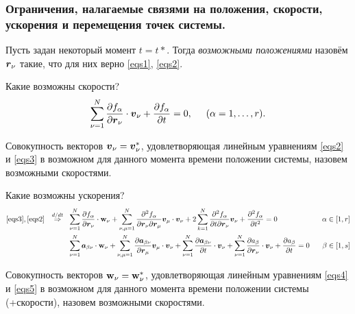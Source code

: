 \subsubsection*{Ограничения, налагаемые связями на положения, скорости, ускорения и перемещения точек системы.}

Пусть задан некоторый момент $t = t*$. Тогда \textit{возможными положениями} назовём $\mbox{\boldmath $r$}_\nu$ такие, что для них верно \eqref{eqs1}, \eqref{eqs2}. 

Какие возможны скорости?
\begin{equation}
    \label{eqs3}
    \sum_{\nu=1}^N \frac{\partial f_\alpha}{\partial \mbox{\boldmath $r$}_\nu} \cdot \mbox{\boldmath $v$}_\nu +   \frac{\partial f_\alpha}{\partial t} = 0, \hspace{0.5cm} (\alpha = 1, \ldots, r).
\end{equation}

Совокупность векторов $\mbox{\boldmath $v$}_\nu = \mbox{\boldmath $v$}_\nu^*$, удовлетворяющая линейным
уравнениям \eqref{eqs2} и \eqref{eqs3} в возможном для данного момента времени положении
системы, назовем возможными скоростями. 

Какие возможны ускорения?
\begin{align}
\label{eqs4}
    \eqref{eqs3}, \eqref{eqs2}
    \hspace{0.25cm} \overset{d / dt}{\Rightarrow} \hspace{0.25cm} 
    & \sum_{\nu=1}^N \frac{\partial f_\alpha}{\partial \mbox{\boldmath $r$}_\nu} \cdot \mbox{\boldmath $\mathrm{w}$}_\nu +
    \sum_{\nu, \mu=1}^N \frac{\partial^2 f_\alpha}{\partial \mbox{\boldmath $r$}_\nu \partial \mbox{\boldmath $r$}_\mu} \mbox{\boldmath $v$}_\mu \cdot \mbox{\boldmath $v$}_\nu + 2 \sum_{k=1}^N \frac{\partial^2 f_\alpha}{\partial t \partial \mbox{\boldmath $r$}_\nu} \mbox{\boldmath $v$}_\nu + \frac{\partial^2 f_\alpha}{\partial t^2}  = 0 
    \hspace{0.25cm} &\alpha \in [1, r]\\
\label{eqs5}
    & \sum_{\nu=1}^N \mbox{\boldmath $a$}_{\beta\nu} \cdot \mbox{\boldmath $\mathrm{w}$}_\nu + \sum_{\nu, \mu =1}^N \frac{\partial \mbox{\boldmath $a$}_{\beta\nu}}{\partial \mbox{\boldmath $r$}_\mu} \mbox{\boldmath $v$}_\mu \cdot \mbox{\boldmath $v$}_\nu + \sum_{\nu=1}^N \frac{\partial \mbox{\boldmath $a$}_{\beta\nu}}{\partial t} \cdot \mbox{\boldmath $v$}_\nu + \sum_{\nu=1}^N \frac{\partial a_\beta}{\partial \mbox{\boldmath $r$}_\nu} \cdot \mbox{\boldmath $v$}_\nu + \frac{\partial  a_\beta}{\partial t} = 0
     \hspace{0.25cm} &\beta \in [1, s]
\end{align}

Совокупность векторов $\mbox{\boldmath $\mathrm{w}$}_\nu =\mbox{\boldmath $\mathrm{w}$}_\nu^*$, удовлетворяющая линейным
уравнениям \eqref{eqs4} и \eqref{eqs5} в возможном для данного момента времени положении
системы (+скорости), назовем возможными скоростями. 


